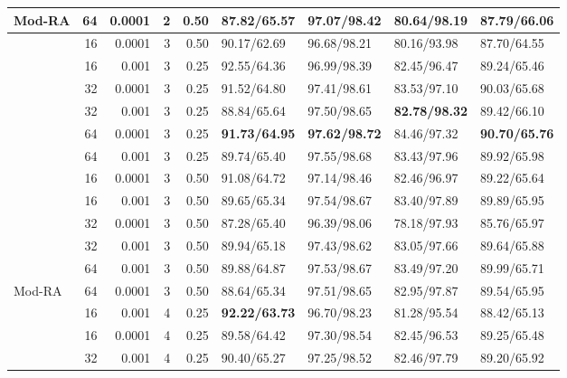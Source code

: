 \begin{table}
\begin{tabular}{l|rr|rr|llll}
                Mod-RA & 64    & 0.0001    & 2  & 0.50     & 87.82/65.57   & 97.07/98.42    & \textbf{80.64/98.19}   & 87.79/66.06   \\
                \midrule
                & 16    & 0.0001    & 3  & 0.50     & 90.17/62.69   & 96.68/98.21    & 80.16/93.98   & 87.70/64.55    \\
                & 16    & 0.001     & 3  & 0.25     & 92.55/64.36   & 96.99/98.39    & 82.45/96.47   & 89.24/65.46   \\
                & 32    & 0.0001    & 3  & 0.25     & 91.52/64.80   & 97.41/98.61    & 83.53/97.10   & 90.03/65.68   \\
                & 32    & 0.001     & 3  & 0.25     & 88.84/65.64   & 97.50/98.65    & \textbf{82.78/98.32}   & 89.42/66.10    \\
                & 64    & 0.0001    & 3  & 0.25     & \textbf{91.73/64.95}   & \textbf{97.62/98.72}    & 84.46/97.32   & \textbf{90.70/65.76}    \\
                & 64    & 0.001     & 3  & 0.25     & 89.74/65.40   & 97.55/98.68    & 83.43/97.96   & 89.92/65.98   \\
                & 16    & 0.0001    & 3  & 0.50     & 91.08/64.72   & 97.14/98.46    & 82.46/96.97   & 89.22/65.64   \\
                & 16    & 0.001     & 3  & 0.50     & 89.65/65.34   & 97.54/98.67    & 83.40/97.89   & 89.89/65.95   \\
                & 32    & 0.0001    & 3  & 0.50     & 87.28/65.40   & 96.39/98.06    & 78.18/97.93   & 85.76/65.97   \\
                & 32    & 0.001     & 3  & 0.50     & 89.94/65.18   & 97.43/98.62    & 83.05/97.66   & 89.64/65.88   \\
                & 64    & 0.001     & 3  & 0.50     & 89.88/64.87   & 97.53/98.67    & 83.49/97.20   & 89.99/65.71   \\
                Mod-RA & 64    & 0.0001    & 3  & 0.50     & 88.64/65.34   & 97.51/98.65    & 82.95/97.87   & 89.54/65.95   \\
                \midrule
                & 16    & 0.001     & 4  & 0.25     & \textbf{92.22/63.73}   & 96.70/98.23    & 81.28/95.54   & 88.42/65.13   \\
                & 16    & 0.0001    & 4  & 0.25     & 89.58/64.42   & 97.30/98.54    & 82.45/96.53   & 89.25/65.48   \\
                & 32    & 0.001     & 4  & 0.25     & 90.40/65.27   & 97.25/98.52    & 82.46/97.79   & 89.20/65.92    \\

\end{tabular}
\end{table}

